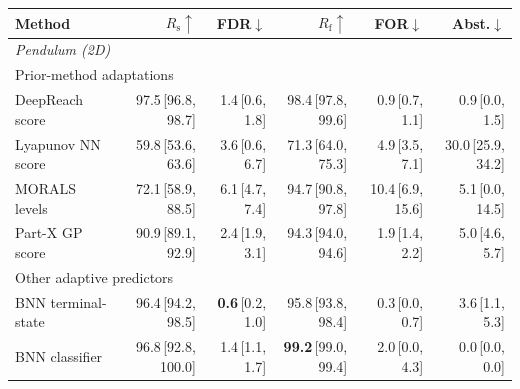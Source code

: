 \begin{tabular}{lrrrrr}
\toprule
\textbf{Method} & $R_{\mathrm{s}}\uparrow$ & FDR$\downarrow$ & $R_{\mathrm{f}}\uparrow$ & FOR$\downarrow$ & Abst.$\downarrow$ \\
\midrule
\multicolumn{6}{l}{\textit{Pendulum (2D)}} \\
\multicolumn{6}{l}{\footnotesize\color{black!55} Prior-method adaptations} \\
DeepReach score & 97.5\,{\scriptsize\color{black!55}[96.8, 98.7]} & 1.4\,{\scriptsize\color{black!55}[0.6, 1.8]} & 98.4\,{\scriptsize\color{black!55}[97.8, 99.6]} & 0.9\,{\scriptsize\color{black!55}[0.7, 1.1]} & 0.9\,{\scriptsize\color{black!55}[0.0, 1.5]} \\
Lyapunov NN score & 59.8\,{\scriptsize\color{black!55}[53.6, 63.6]} & 3.6\,{\scriptsize\color{black!55}[0.6, 6.7]} & 71.3\,{\scriptsize\color{black!55}[64.0, 75.3]} & 4.9\,{\scriptsize\color{black!55}[3.5, 7.1]} & 30.0\,{\scriptsize\color{black!55}[25.9, 34.2]} \\
MORALS levels & 72.1\,{\scriptsize\color{black!55}[58.9, 88.5]} & 6.1\,{\scriptsize\color{black!55}[4.7, 7.4]} & 94.7\,{\scriptsize\color{black!55}[90.8, 97.8]} & 10.4\,{\scriptsize\color{black!55}[6.9, 15.6]} & 5.1\,{\scriptsize\color{black!55}[0.0, 14.5]} \\
Part-X GP score & 90.9\,{\scriptsize\color{black!55}[89.1, 92.9]} & 2.4\,{\scriptsize\color{black!55}[1.9, 3.1]} & 94.3\,{\scriptsize\color{black!55}[94.0, 94.6]} & 1.9\,{\scriptsize\color{black!55}[1.4, 2.2]} & 5.0\,{\scriptsize\color{black!55}[4.6, 5.7]} \\
\multicolumn{6}{l}{\footnotesize\color{black!55} Other adaptive predictors} \\
BNN terminal-state & 96.4\,{\scriptsize\color{black!55}[94.2, 98.5]} & \textbf{0.6}\,{\scriptsize\color{black!55}[0.2, 1.0]} & 95.8\,{\scriptsize\color{black!55}[93.8, 98.4]} & 0.3\,{\scriptsize\color{black!55}[0.0, 0.7]} & 3.6\,{\scriptsize\color{black!55}[1.1, 5.3]} \\
BNN classifier & 96.8\,{\scriptsize\color{black!55}[92.8, 100.0]} & 1.4\,{\scriptsize\color{black!55}[1.1, 1.7]} & \textbf{99.2}\,{\scriptsize\color{black!55}[99.0, 99.4]} & 2.0\,{\scriptsize\color{black!55}[0.0, 4.3]} & 0.0\,{\scriptsize\color{black!55}[0.0, 0.0]} \\

\end{tabular}
